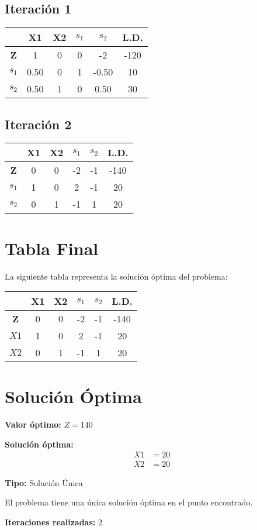 \documentclass[12pt]{article}
\begin{document}
\subsection{Iteración 1}
\begin{center}
\small
\begin{tabular}{|c|c|c|c|c|c|}
\hline
 & \textbf{X1} & \textbf{X2} & \textbf{$s_1$} & \textbf{$s_2$} & \textbf{L.D.} \\
\hline
\textbf{Z} & 1 & 0 & 0 & -2 & -120 \\
\hline
\textbf{$s_1$} & 0.50 & 0 & 1 & -0.50 & 10 \\
\hline
\textbf{$s_2$} & 0.50 & 1 & 0 & 0.50 & 30 \\
\hline
\end{tabular}
\end{center}

\subsection{Iteración 2}
\begin{center}
\small
\begin{tabular}{|c|c|c|c|c|c|}
\hline
 & \textbf{X1} & \textbf{X2} & \textbf{$s_1$} & \textbf{$s_2$} & \textbf{L.D.} \\
\hline
\textbf{Z} & 0 & 0 & -2 & -1 & -140 \\
\hline
\textbf{$s_1$} & 1 & 0 & 2 & -1 & 20 \\
\hline
\textbf{$s_2$} & 0 & 1 & -1 & 1 & 20 \\
\hline
\end{tabular}
\end{center}

\section{Tabla Final}

La siguiente tabla representa la solución óptima del problema:

\begin{center}
\small
\begin{tabular}{|c|c|c|c|c|c|}
\hline
 & \textbf{X1} & \textbf{X2} & \textbf{$s_1$} & \textbf{$s_2$} & \textbf{L.D.} \\
\hline
\textbf{Z} & 0 & 0 & -2 & -1 & -140 \\
\hline
\textbf{$X1$} & 1 & 0 & 2 & -1 & 20 \\
\hline
\textbf{$X2$} & 0 & 1 & -1 & 1 & 20 \\
\hline
\end{tabular}
\end{center}

\section{Solución Óptima}

\textbf{Valor óptimo: } $Z = 140$

\textbf{Solución óptima:}
\begin{align*}
X1 &= 20 \\
X2 &= 20
\end{align*}

\textbf{Tipo:} Solución Única

El problema tiene una única solución óptima en el punto encontrado.

\textbf{Iteraciones realizadas:} 2
\end{document}
